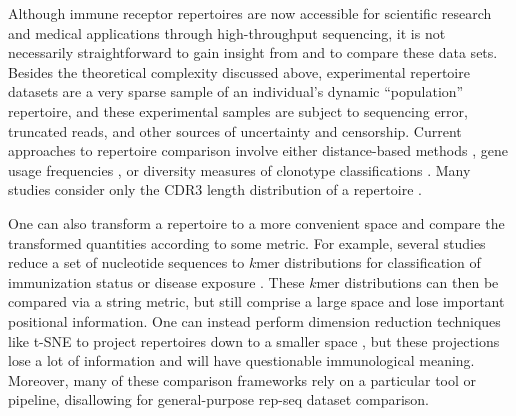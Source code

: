 \documentclass{article}
\begin{document}
Although immune receptor repertoires are now accessible for scientific research and medical applications through high-throughput sequencing, it is not necessarily straightforward to gain insight from and to compare these data sets.
Besides the theoretical complexity discussed above, experimental repertoire datasets are a very sparse sample of an individual's dynamic ``population'' repertoire, and these experimental samples are subject to sequencing error, truncated reads, and other sources of uncertainty and censorship.
Current approaches to repertoire comparison involve either distance-based methods \cite{Dash2017-rz}, gene usage frequencies \cite{Hou2016-qc, Martin2015-ho, Corcoran2016-nw, Gadala2015-wq, Boyd2010-hd, Bolen2017-xt}, or diversity measures of clonotype classifications \cite{Aouinti2015-ke, Bischof2016-fn}.
Many studies consider only the CDR3 length distribution of a repertoire \cite{Miqueu2007-lk}.

One can also transform a repertoire to a more convenient space and compare the transformed quantities according to some metric.
For example, several studies reduce a set of nucleotide sequences to $k$mer distributions for classification of immunization status or disease exposure \cite{Madi2014-lt, Ostmeyer2017-xg, Heather2017pf}.
These $k$mer distributions can then be compared via a string metric, but still comprise a large space and lose important positional information.
One can instead perform dimension reduction techniques like t-SNE to project repertoires down to a smaller space \cite{Yokota2017-zm}, but these projections lose a lot of information and will have questionable immunological meaning.
Moreover, many of these comparison frameworks rely on a particular tool or pipeline, disallowing for general-purpose rep-seq dataset comparison.
\end{document}

